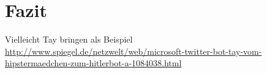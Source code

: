 \section{Fazit}

Vielleicht Tay bringen als Beispiel 
\url{http://www.spiegel.de/netzwelt/web/microsoft-twitter-bot-tay-vom-hipstermaedchen-zum-hitlerbot-a-1084038.html}